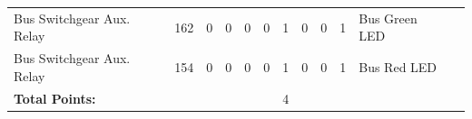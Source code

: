 \begin{table}[!htp]
{\begin{tabular}{lcccccccccll}
			Bus Switchgear Aux. Relay          & 162                     & 0                                           & 0                                          & 0           & 0           & 1            & 0                & 0 & 1                            & Bus Green LED                    &                \\
			Bus Switchgear Aux. Relay          & 154                     & 0                                           & 0                                          & 0           & 0           & 1            & 0                & 0 & 1                            & Bus Red LED                      &                \\ \midrule
			\textbf{Total Points:}             &                         &                                             &                                            &             &             & 4            &                  &   &                              &                                  &                \\ \bottomrule
		\end{tabular}
	}
\end{table}

